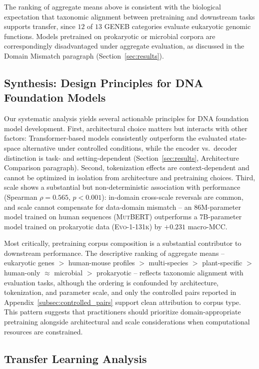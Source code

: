 \documentclass{llmxive}
\begin{document}
The ranking of aggregate means above is consistent with the
biological expectation that taxonomic alignment between pretraining
and downstream tasks supports transfer, since $12$ of $13$ GENEB
categories evaluate eukaryotic genomic functions. Models pretrained
on prokaryotic or microbial corpora are correspondingly disadvantaged
under aggregate evaluation, as discussed in the Domain Mismatch
paragraph (Section~\ref{sec:results}).

\subsection{Synthesis: Design Principles for DNA Foundation Models}
\label{subsec:synthesis}

Our systematic analysis yields several actionable principles for DNA
foundation model development. First, architectural choice matters but
interacts with other factors: Transformer-based models consistently
outperform the evaluated state-space alternative under controlled
conditions, while the encoder vs.\ decoder distinction is task- and
setting-dependent (Section~\ref{sec:results}, Architecture Comparison
paragraph). Second, tokenization effects are context-dependent and
cannot be optimized in isolation from architecture and pretraining
choices. Third, scale shows a substantial but non-deterministic
association with performance (Spearman $\rho = 0.565$, $p < 0.001$):
in-domain cross-scale reversals are common, and scale cannot
compensate for data-domain mismatch -- an 86M-parameter model trained
on human sequences (\textsc{MutBERT}) outperforms a 7B-parameter
model trained on prokaryotic data (\textsc{Evo-1-131k}) by $+0.231$
macro-MCC.

Most critically, pretraining corpus composition is a substantial
contributor to downstream performance. The descriptive ranking of
aggregate means -- eukaryotic genes $>$ human-mouse profiles $>$
multi-species $>$ plant-specific $>$ human-only $\approx$ microbial
$>$ prokaryotic -- reflects taxonomic alignment with evaluation
tasks, although the ordering is confounded by architecture,
tokenization, and parameter scale, and only the controlled pairs
reported in Appendix~\ref{subsec:controlled_pairs} support clean
attribution to corpus type. This pattern suggests that practitioners
should prioritize domain-appropriate pretraining alongside
architectural and scale considerations when computational resources
are constrained.

\subsection{Transfer Learning Analysis}
\label{subsec:transfer_learning}
\end{document}
